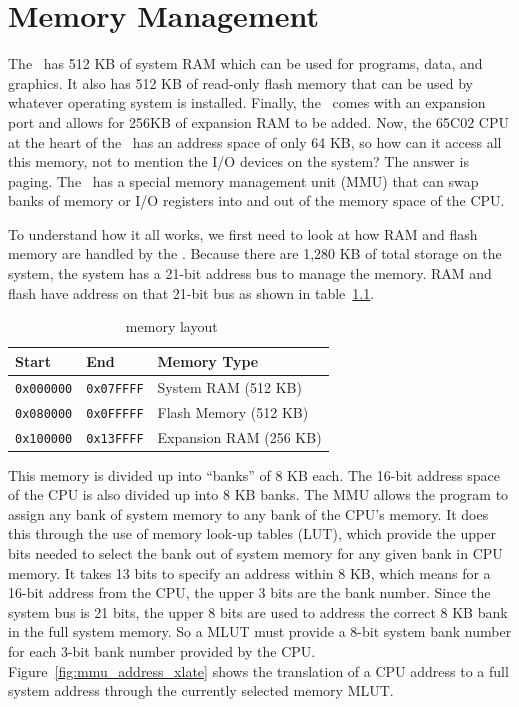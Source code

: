 \chapter{Memory Management}

The \jr\ has 512 KB of system RAM which can be used for programs, data, and graphics. It also has 512 KB of read-only flash memory that can be used by whatever operating system is installed. Finally, the \jr\ comes with an expansion port and allows for 256KB of expansion RAM to be added. Now, the 65C02 CPU at the heart of the \jr\ has an address space of only 64 KB, so how can it access all this memory, not to mention the I/O devices on the system? The answer is paging. The \jr\ has a special memory management unit (MMU) that can swap banks of memory or I/O registers into and out of the memory space of the CPU.

To understand how it all works, we first need to look at how RAM and flash memory are handled by the \jr. Because there are 1,280 KB of total storage on the system, the system has a 21-bit address bus to manage the memory. RAM and flash have address on that 21-bit bus as shown in table~\ref{tab:memory}.

\begin{table}[ht]
	\begin{center}
		\begin{tabular}{| l | l | l |} \hline
			Start & End & Memory Type \\ \hline\hline
		  	\verb+0x000000+ & \verb+0x07FFFF+ & System RAM (512 KB)\\ \hline
			\verb+0x080000+ & \verb+0x0FFFFF+ & Flash Memory (512 KB) \\ \hline
			\verb+0x100000+ & \verb+0x13FFFF+ & Expansion RAM (256 KB)\\ \hline
		\end{tabular}
	\end{center}
	\caption{\jr\ memory layout}
	\label{tab:memory}
\end{table}

This memory is divided up into ``banks'' of 8 KB each. The 16-bit address space of the CPU is also divided up into 8 KB banks. The MMU allows the program to assign any bank of system memory to any bank of the CPU's memory. It does this through the use of memory look-up tables (LUT), which provide the upper bits needed to select the bank out of system memory for any given bank in CPU memory. It takes 13 bits to specify an address within 8 KB, which means for a 16-bit address from the CPU, the upper 3 bits are the bank number. Since the system bus is 21 bits, the upper 8 bits are used to address the correct 8 KB bank in the full system memory. So a MLUT must provide a 8-bit system bank number for each 3-bit bank number provided by the CPU. Figure~\ref{fig:mmu_address_xlate} shows the translation of a CPU address to a full system address through the currently selected memory MLUT.

